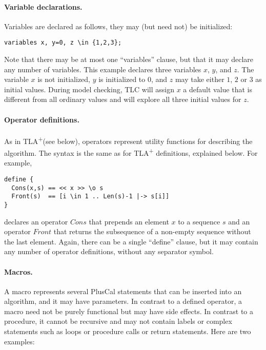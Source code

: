 \documentclass[11pt,fleqn]{article}
\newcommand{\tlaplus}{TLA\textsuperscript{+}\xspace}
\begin{document}
\paragraph{Variable declarations.}

Variables are declared as follows, they may (but need not) be initialized:

\verb|variables x, y=0, z \in {1,2,3};|

Note that there may be at most one ``variables'' clause, but that it may declare
any number of variables. This example declares three variables $x$, $y$, and
$z$. The variable $x$ is not initialized, $y$ is initialized to $0$, and $z$ may
take either $1$, $2$ or $3$ as initial values. During model checking, TLC will
assign $x$ a default value that is different from all ordinary values and will
explore all three initial values for $z$.

\paragraph{Operator definitions.}

As in \tlaplus (see below), operators represent utility functions for describing
the algorithm. The syntax is the same as for \tlaplus definitions, explained
below. For example,

\begin{verbatim}
define {
  Cons(x,s) == << x >> \o s
  Front(s)  == [i \in 1 .. Len(s)-1 |-> s[i]]
}
\end{verbatim}

declares an operator $\mathit{Cons}$ that prepends an element $x$ to a sequence
$s$ and an operator $\mathit{Front}$ that returns the subsequence of a non-empty
sequence without the last element. Again, there can be a single ``define''
clause, but it may contain any number of operator definitions, without any
separator symbol.

\paragraph{Macros.}

A macro represents several PlusCal statements that can be inserted into an
algorithm, and it may have parameters. In contrast to a defined operator, a
macro need not be purely functional but may have side effects. In contrast to a
procedure, it cannot be recursive and may not contain labels or complex
statements such as loops or procedure calls or return statements. Here are two
examples:
\end{document}
